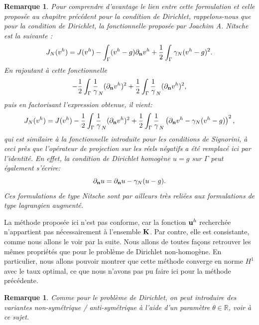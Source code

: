 \documentclass[11pt]{book}
\newtheorem{remark}[theorem]{Remarque}
\newcommand{\br}{\begin{remark}}
\newcommand{\er}{\end{remark}}
\def\u{{\bf u}}
\def\n{{\bf n}}
\def\K{{\bf K}}
\newcommand{\R}{\mathbb{R}}
\newcommand{\gN}{\gamma_{N}}
\newcommand{\dnu}{\partial_{\n} u}
\newcommand{\dnv}{\partial_{\n} v}
\begin{document}
\br Pour comprendre d'avantage le lien entre cette formulation et celle proposée au chapitre précédent pour la condition de Dirichlet, rappelons-nous que pour la condition de Dirichlet, la fonctionnelle proposée par Joachim A. Nitsche est la suivante :
\[
J_N ( v^h ) = J ( v^h ) 
-  \int_\Gamma ( v^h  - g ) \dnv^h
+ \frac{1}{2} \int_\Gamma \gN (v^h-g)^2.
\]
En rajoutant à cette fonctionnelle
\[
- \frac{1}{2} \int_\Gamma \frac1\gN (\dnv^h)^2 + \frac{1}{2} \int_\Gamma \frac1\gN (\dnv^h)^2,
\]
puis en factorisant l'expression obtenue, il vient:
\[
J_N ( v^h ) = J ( v^h ) 
- \frac{1}{2} \int_\Gamma \frac1\gN (\dnv^h)^2
+ \frac12 \int_\Gamma \frac1\gN \left ( \dnv^h - \gN (v^h-g) \right)^2,
\]
qui est similaire à la fonctionnelle introduite pour les conditions de Signorini, à ceci près que l'opérateur de projection sur les réels négatifs a été remplacé ici par l'identité. En effet, la condition de Dirichlet homogène $u = g$ sur $\Gamma$ peut également s'écrire:
\[
 \dnu = \dnu - \gN (u - g).
\]
Ces formulations de type Nitsche sont par ailleurs très reliées aux formulations de type lagrangien augmenté.
\er

La méthode proposée ici n'est pas conforme, car la fonction $\u^h$ recherchée n'appartient pas nécessairement à l'ensemble $\K$. Par contre, elle est consistante, comme nous allons le voir par la suite. Nous allons de toutes façons retrouver les mêmes propriétés que pour le problème de Dirichlet non-homogène. En particulier, nous allons pouvoir montrer que cette méthode converge en norme $H^1$ avec le taux optimal, ce que nous n'avons pas pu faire ici pour la méthode précédente.

\br
Comme pour le problème de Dirichlet, on peut introduire des variantes non-symétrique / anti-symétrique à l'aide d'un paramètre $\theta \in \R$, voir \cite{chouly-hild-renard-13} à ce sujet.
\er
\end{document}
